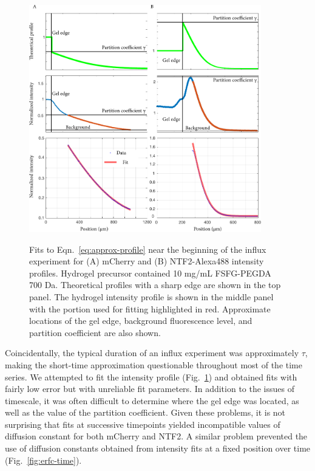 \begin{figure}
\caption[Fits to concentration profiles at a fixed time.]{Fits to Eqn.~\ref{eq:approx-profile} near the beginning of the influx experiment for (A) mCherry and (B) NTF2-Alexa488 intensity profiles.  Hydrogel precursor contained 10 mg/mL FSFG-PEGDA 700 Da.  Theoretical profiles with a sharp edge are shown in the top panel.  The hydrogel intensity profile is shown in the middle panel with the portion used for fitting highlighted in red.  Approximate locations of the gel edge, background fluorescence level, and partition coefficient are also shown.}
\centering
\includegraphics[width=0.9\textwidth]{figs/ch04/mCherry-erfc-position.pdf}
\label{fig:erfc-position}
\end{figure} 

Coincidentally, the typical duration of an influx experiment was approximately $\tau$, making the short-time approximation questionable throughout most of the time series.  We attempted to fit the intensity profile (Fig.~\ref{fig:erfc-position}) and obtained fits with fairly low error but with unreliable fit parameters.  In addition to the issues of timescale, it was often difficult to determine where the gel edge was located, as well as the value of the partition coefficient.  Given these problems, it is not surprising that fits at successive timepoints yielded incompatible values of diffusion constant for both mCherry and NTF2.  A similar problem prevented the use of diffusion constants obtained from intensity fits at a fixed position over time (Fig.~\ref{fig:erfc-time}).



